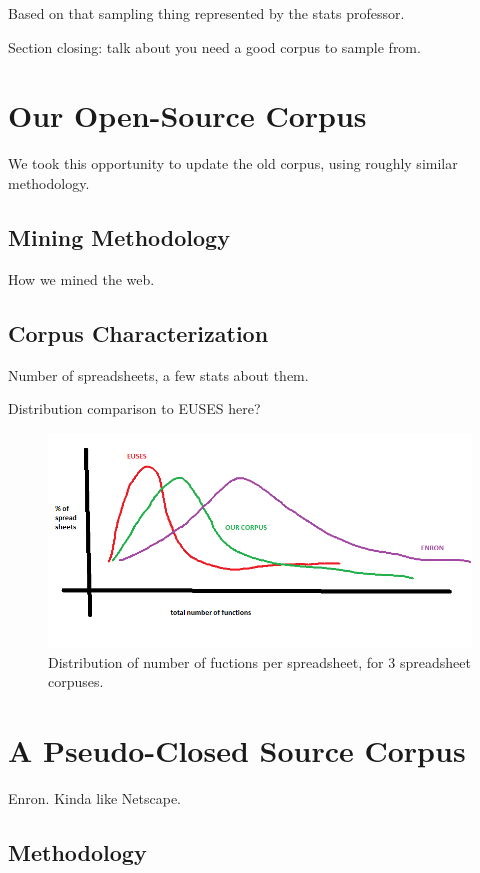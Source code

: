 \documentclass{sig-alternate} %
\begin{document}
Based on that sampling thing represented by the stats professor.

Section closing: talk about you need a good corpus to sample from.

\section{Our Open-Source Corpus}

We took this opportunity to update the old corpus, using roughly similar
methodology.

\subsection{Mining Methodology}

How we mined the web.

\subsection{Corpus Characterization}

Number of spreadsheets, a few stats about them.

Distribution comparison to EUSES here?

\begin{figure}
\centering
\includegraphics[width=\columnwidth]{functions.png}
\caption{Distribution of number of fuctions per spreadsheet, for 3 spreadsheet corpuses.}
\label{fig:effectiveness}
\end{figure}

\section{A Pseudo-Closed Source Corpus}

Enron. Kinda like Netscape.

\subsection{Methodology}
\end{document}
